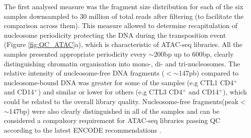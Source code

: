 The first analysed measure was the fragment size distribution for each of the six samples downsampled to 30 million of total reads after filtering (to facilitate the comparison across them). This measure allowed to determine recapitulation of nucleosome periodicity protecting the DNA during the transposition event (Figure \ref{fig:QC_ATAC}a), which is characteristic of ATAC-seq libraries. All the samples presented appropriate periodicity every $\sim$200bp up to 600bp, clearly distinguishing chromatin organisation into mono-, di- and tri-nucleosomes. The relative intensity of nucleosome-free DNA fragments ($<$$\sim$147pb) compared to nucleosome-bound DNA was greater for some of the samples (e.g CTL1 CD4$^+$ and CD14$^+$) and similar or lower for others (e.g CTL3 CD4$^+$ and CD14$^+$), which could be related to the overall library quality. %
Nucleosome-free fragments(peak$<$$\sim$147bp) were also clearly distinguished in all of the samples and can be considered a compulsory requirement for ATAC-seq libraries passing QC according to the latest ENCODE recommendations \parencite{ENCODE}.


